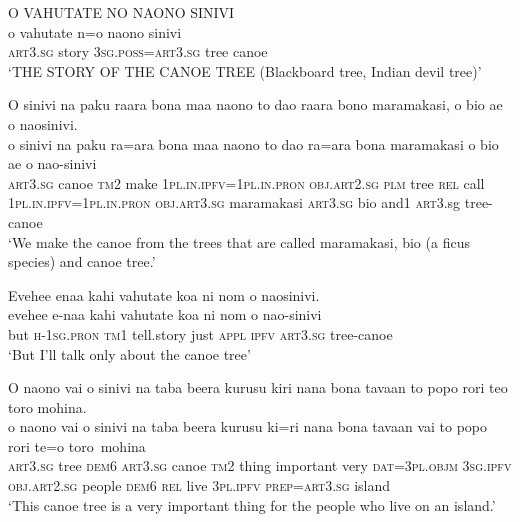 \ea\label{ex:text3-1}
O VAHUTATE NO NAONO SINIVI\\
\gll o	vahutate	n=o	naono	sinivi\\
     \textsc{art}3.\textsc{sg}	story	3\textsc{sg}.\textsc{poss}=\textsc{art}3.\textsc{sg}	tree	canoe\\
\glt `THE STORY OF THE CANOE TREE (Blackboard tree, Indian devil tree)'
\z

\ea\label{ex:text3-2}
O sinivi na paku raara bona maa naono to dao raara bono maramakasi, o bio ae o naosinivi.\\
\gll o	sinivi	na	paku	ra=ara	bona	maa	naono	to	dao	ra=ara	bona	maramakasi	o	bio	ae	o	nao-sinivi\\
     \textsc{art}3.\textsc{sg}	canoe	\textsc{tm}2	make	1\textsc{pl}.\textsc{in}.\textsc{ipfv}=1\textsc{pl}.\textsc{in}.\textsc{pron}	\textsc{obj}.\textsc{art}2.\textsc{sg}	\textsc{plm}	tree	\textsc{rel}	call	1\textsc{pl}.\textsc{in}.\textsc{ipfv}=1\textsc{pl}.\textsc{in}.\textsc{pron}	\textsc{obj}.\textsc{art}3.\textsc{sg}	maramakasi	\textsc{art}3.\textsc{sg}	bio	and1	\textsc{art}3.sg	tree-canoe\\
\glt `We make the canoe from the trees that are called maramakasi, bio (a ficus species) and canoe tree.'
\z

\ea\label{ex:text3-3}
Evehee enaa kahi vahutate koa ni nom o naosinivi.\\
\gll evehee	e-naa	kahi	vahutate	koa	ni	nom	o	nao-sinivi\\
     but	\textsc{h}-1\textsc{sg}.\textsc{pron}	\textsc{tm}1	tell.story	just	\textsc{appl}	\textsc{ipfv}	\textsc{art}3.\textsc{sg}	tree-canoe\\
\glt `But I'll talk only about the canoe tree'
\z

\ea\label{ex:text3-4}
O naono vai o sinivi na taba beera kurusu kiri nana bona tavaan to popo rori teo toro mohina.\\
\gll o	naono	vai	o	sinivi	na	taba	beera	kurusu	ki=ri	nana	bona	tavaan	vai	to	popo	rori	te=o	toro~mohina\\
     \textsc{art}3.\textsc{sg}	tree	\textsc{dem}6	\textsc{art}3.\textsc{sg}	canoe	\textsc{tm}2	thing	important	very	\textsc{dat}=3\textsc{pl}.\textsc{objm}	3\textsc{sg}.\textsc{ipfv}	\textsc{obj}.\textsc{art}2.\textsc{sg}	people	\textsc{dem}6	\textsc{rel}	live	3\textsc{pl}.\textsc{ipfv}	\textsc{prep}=\textsc{art}3.\textsc{sg}	island\\
\glt `This canoe tree is a very important thing for the people who live on an island.'
\z

